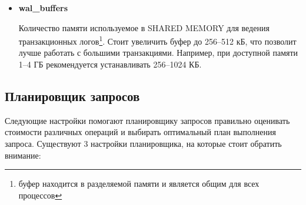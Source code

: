 \begin{itemize}
\item \textbf{wal\_buffers}

Количество памяти используемое в SHARED MEMORY для ведения транзакционных логов\footnote{буфер находится в 
разделяемой памяти и является общим для всех процессов}.
Стоит увеличить буфер до 256--512 кБ, что позволит лучше работать с большими транзакциями.
Например, при доступной памяти 1--4 ГБ рекомендуется устанавливать 256--1024 КБ.

\end{itemize}


\subsection{Планировщик запросов}
Следующие настройки помогают планировщику запросов правильно оценивать стоимости различных 
операций и выбирать оптимальный план выполнения запроса. Существуют 3 настройки планировщика, 
на которые стоит обратить внимание:
